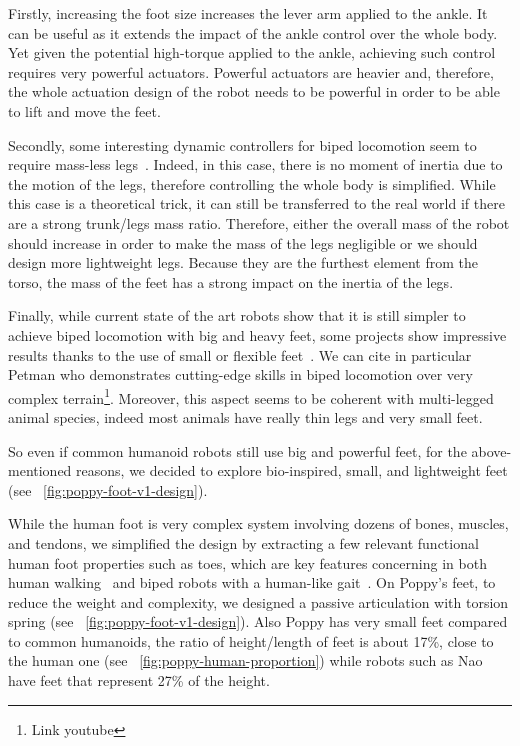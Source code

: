 Firstly, increasing the foot size increases the lever arm applied to the ankle. It can be useful as it extends the impact of the ankle control over the whole body. Yet given the potential high-torque applied to the ankle, achieving such control requires very powerful actuators.
Powerful actuators are heavier and, therefore, the whole actuation design of the robot needs to be powerful in order to be able to lift and move the feet.

Secondly, some interesting dynamic controllers for biped locomotion seem to require mass-less legs~\parencite{hyon2002development}. Indeed, in this case, there is no moment of inertia due to the motion of the legs, therefore controlling the whole body is simplified. While this case is a theoretical trick, it can still be transferred to the real world if there are a strong trunk/legs mass ratio. Therefore, either the overall mass of the robot should increase in order to make the mass of the legs negligible or we should design more lightweight legs.
Because they are the furthest element from the torso, the mass of the feet has a strong impact on the inertia of the legs.

Finally, while current state of the art robots show that it is still simpler to achieve biped locomotion with big and heavy feet, some projects show impressive results thanks to the use of small or flexible feet~\parencite{bruneau2001dynamic}. We can cite in particular Petman who demonstrates cutting-edge skills in biped locomotion over very complex terrain\footnote{Link youtube}.
Moreover, this aspect seems to be coherent with multi-legged animal species, indeed most animals have really thin legs and very small feet.

So even if common humanoid robots still use big and powerful feet, for the above-mentioned reasons, we decided to explore bio-inspired, small, and lightweight feet (see \figurename~\ref{fig:poppy-foot-v1-design}).


While the human foot is very complex system involving dozens of bones, muscles, and tendons, we simplified the design by extracting a few relevant functional human foot properties such as toes, which are key features concerning in both human walking~\cite{Hughes1990} and biped robots with a human-like gait~\cite{Sellaouti2006}. On Poppy's feet, to reduce the weight and complexity, we designed a passive articulation with torsion spring (see \figurename~\ref{fig:poppy-foot-v1-design}).
Also Poppy has very small feet compared to common humanoids, the ratio of height/length of feet is about 17\%,  close to the human one (see \figurename~\ref{fig:poppy-human-proportion}) while robots such as Nao have feet that represent 27\% of the height.

